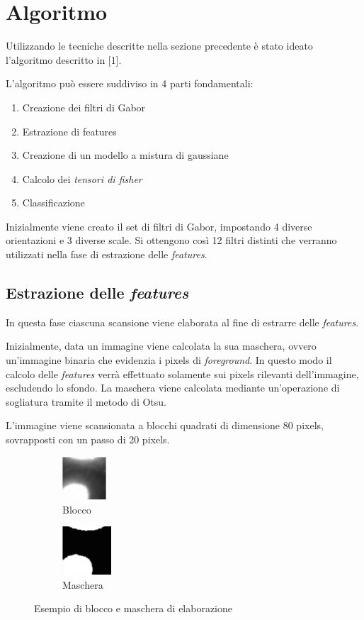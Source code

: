 \section{Algoritmo}

Utilizzando le tecniche descritte nella sezione precedente è stato ideato l'algoritmo descritto in [1].

L'algoritmo può essere suddiviso in 4 parti fondamentali:
\begin{enumerate}
\item Creazione dei filtri di Gabor
\item Estrazione di features
\item Creazione di un modello a mistura di gaussiane
\item Calcolo dei \emph{tensori di fisher}
\item Classificazione
\end{enumerate}

Inizialmente viene creato il set di filtri di Gabor, impostando 4 diverse orientazioni e 3 diverse scale. Si ottengono così 12 filtri distinti che verranno utilizzati nella fase di estrazione delle \emph{features}.

\subsection{Estrazione delle \emph{features}}

In questa fase ciascuna scansione viene elaborata al fine di estrarre delle \emph{features}. 

Inizialmente, data un immagine viene calcolata la sua maschera, ovvero un'immagine binaria che evidenzia i pixels di \emph{foreground}. In questo modo il calcolo delle \emph{features} verrà effettuato solamente sui pixels rilevanti dell'immagine, escludendo lo sfondo. La maschera viene calcolata mediante un'operazione di sogliatura tramite il metodo di Otsu.

L'immagine viene scansionata a blocchi quadrati di dimensione 80 pixels, sovrapposti con un passo di 20 pixels.

\begin{figure}[H]
\captionsetup[subfigure]{labelformat=empty}
\begin{subfigure}{.5\textwidth}
\centering
\includegraphics[height=1.6cm]{images/block.png}
\caption{Blocco}
\end{subfigure}%
\begin{subfigure}{.5\textwidth}
\centering
\includegraphics[height=1.8cm]{images/mask.png}
\caption{Maschera}
\end{subfigure}%
\caption{Esempio di blocco e maschera di elaborazione}
\end{figure}

